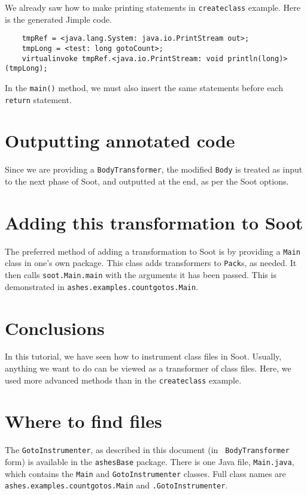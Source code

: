 \documentclass{article}
\begin{document}
We already saw how to make printing statements in {\tt createclass}
example.  Here is the generated Jimple code.
\begin{verbatim}
    tmpRef = <java.lang.System: java.io.PrintStream out>;
    tmpLong = <test: long gotoCount>;
    virtualinvoke tmpRef.<java.io.PrintStream: void println(long)>(tmpLong);
\end{verbatim}

In the {\tt main()} method, we must also insert the same 
statements before each {\tt return} statement.

\section{Outputting annotated code}

Since we are providing a {\tt BodyTransformer}, the modified {\tt Body}
is treated as input to the next phase of Soot, and outputted at the end,
as per the Soot options.

\section{Adding this transformation to Soot}

The preferred method of adding a transformation to Soot is by providing a
{\tt Main} class in one's own package.  This class adds transformers
to {\tt Pack}s, as needed.  It then calls {\tt soot.Main.main} with
the arguments it has been passed.  This is demonstrated in 
{\tt ashes.examples.countgotos.Main}.

\section{Conclusions}

In this tutorial, we have seen how to instrument class files in Soot.
Usually, anything we want to do can be viewed as a transformer of
class files. Here, we used more advanced methods than in the {\tt createclass}
example.

\section*{Where to find files}

The {\tt GotoInstrumenter}, as described in this document (in {\tt
BodyTransformer} form) is available in the {\tt ashesBase} package.
There is one Java file, {\tt Main.java}, which contains the
{\tt Main} and {\tt GotoInstrumenter} classes.
Full class names are {\tt ashes.examples.countgotos.Main} and
{\tt .GotoInstrumenter}.
\end{document}
